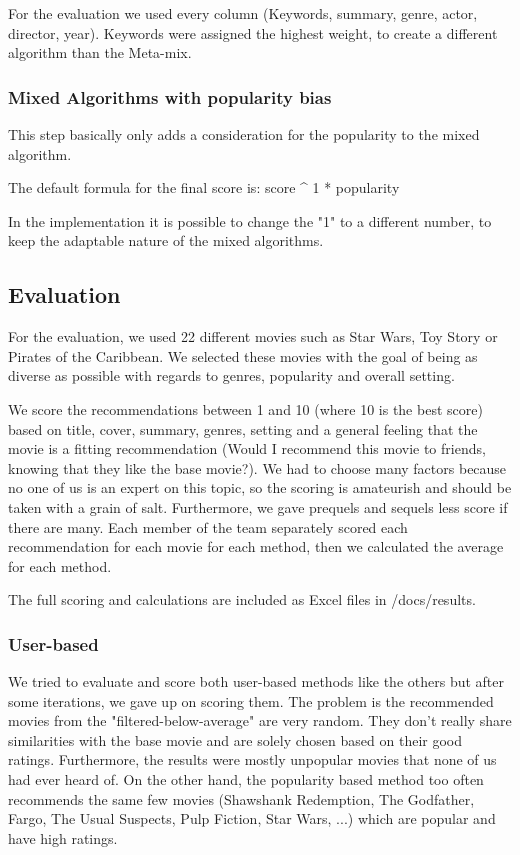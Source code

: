 \documentclass{article}
\begin{document}
For the evaluation we used every column (Keywords, summary, genre, actor, director, year). Keywords were assigned the highest weight, to create a different algorithm than the Meta-mix.
\subsubsection{Mixed Algorithms with popularity bias}
This step basically only adds a consideration for the popularity to the mixed algorithm.

The default formula for the final score is: score ^ 1 * popularity

In the implementation it is possible to change the "1" to a different number, to keep the adaptable nature of the mixed algorithms.
\subsection{Evaluation}
For the evaluation, we used 22 different movies such as Star Wars, Toy Story or Pirates of the Caribbean.
We selected these movies with the goal of being as diverse as possible with regards to genres, popularity and overall setting.

We score the recommendations between 1 and 10 (where 10 is the best score) based on title, cover, summary, genres, setting and a general feeling that the movie is a fitting recommendation (Would I recommend this movie to friends, knowing that they like the base movie?). We had to choose many factors because no one of us is an expert on this topic, so the scoring is amateurish and should be taken with a grain of salt. Furthermore, we gave prequels and sequels less score if there are many.
Each member of the team separately scored each recommendation for each movie for each method, then we calculated the average for each method.

The full scoring and calculations are included as Excel files in /docs/results.
\subsubsection{User-based}
We tried to evaluate and score both user-based methods like the others but after some iterations, we gave up on scoring them. The problem is the recommended movies from the "filtered-below-average" are very random. They don't really share similarities with the base movie and are solely chosen based on their good ratings. Furthermore, the results were mostly unpopular movies that none of us had ever heard of. On the other hand, the popularity based method too often recommends the same few movies (Shawshank Redemption, The Godfather, Fargo, The Usual Suspects, Pulp Fiction, Star Wars, ...) which are popular and have high ratings.
\end{document}
